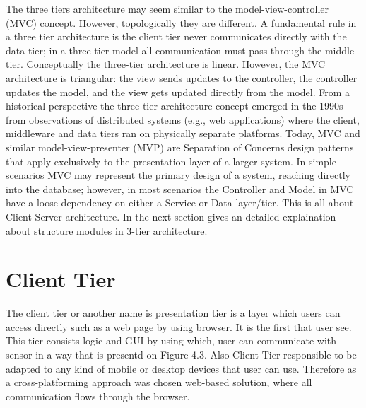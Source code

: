 \newline
The three tiers architecture may seem similar to the model-view-controller (MVC) concept. However, topologically they are different. A fundamental rule in a three tier architecture is the client tier never communicates directly with the data tier; in a three-tier model all communication must pass through the middle tier. Conceptually the three-tier architecture is linear. However, the MVC architecture is triangular: the view sends updates to the controller, the controller updates the model, and the view gets updated directly from the model.
From a historical perspective the three-tier architecture concept emerged in the 1990s from observations of distributed systems (e.g., web applications) where the client, middleware and data tiers ran on physically separate platforms. Today, MVC and similar model-view-presenter (MVP) are Separation of Concerns design patterns that apply exclusively to the presentation layer of a larger system. In simple scenarios MVC may represent the primary design of a system, reaching directly into the database; however, in most scenarios the Controller and Model in MVC have a loose dependency on either a Service or Data layer/tier. This is all about Client-Server architecture.
\newline
In the next section gives an detailed explaination about structure modules in 3-tier architecture.

\section{Client Tier}
  The client tier or another name is presentation tier is a layer which users can access directly such as a web page by using browser. It is the first that user see. This tier consists logic and GUI by using which, user can communicate with sensor in a way that is presentd on Figure 4.3. Also Client Tier responsible to be adapted to any kind of mobile or desktop devices that user can use. Therefore as a cross-platforming approach was chosen web-based solution, where all communication flows through the browser.

